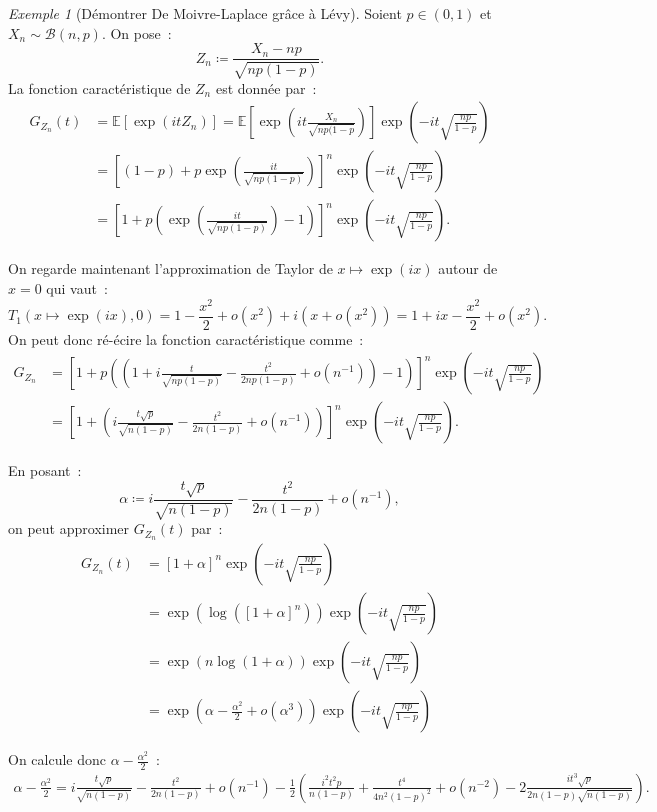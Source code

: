 \documentclass{article}
\newcommand{\E}{\mathbb E}
\theoremstyle{definition}
\theoremstyle{remark}
\newtheorem{ex}{Exemple}
\begin{document}
		\begin{ex}[Démontrer De Moivre-Laplace grâce à Lévy] Soient $p \in (0, 1)$ et $X_n \sim \mathcal B(n, p)$. On pose~:
		\[Z_n \coloneqq \frac {X_n - np}{\sqrt{np(1-p)}}.\]
		La fonction caractéristique de $Z_n$ est donnée par~:
		\begin{align*}
			G_{Z_n}(t) &= \E\left[\exp(itZ_n)\right] = \E\left[\exp\left(it\frac {X_n}{\sqrt{np(1-p}}\right)\right]\exp\left(-it \sqrt{\frac {np}{1-p}}\right) \\
			           &= \left[(1-p) + p\exp\left(\frac {it}{\sqrt{np(1-p)}}\right)\right]^n\exp\left(-it\sqrt {\frac {np}{1-p}}\right) \\
					   &= \left[1+p\left(\exp\left(\frac {it}{\sqrt{np(1-p)}}\right)-1\right)\right]^n\exp\left(-it\sqrt{\frac {np}{1-p}}\right).
		\end{align*}

		On regarde maintenant l'approximation de Taylor de $x \mapsto \exp(ix)$ autour de $x = 0$ qui vaut~:
		\[T_1(x \mapsto \exp(ix), 0) = 1 - \frac {x^2}2 + o(x^2) + i\left(x + o(x^2)\right) = 1 + ix - \frac {x^2}2 + o(x^2).\]
		On peut donc ré-écire la fonction caractéristique comme~:
		\begin{align*}
			G_{Z_n} &= \left[1+p\left(\left(1 + i\frac t{\sqrt{np(1-p)}} - \frac {t^2}{2np(1-p)} + o(n^{-1})\right) - 1\right)\right]^n\exp\left(-it\sqrt{\frac {np}{1-p}}\right) \\
			        &= \left[1+\left(i\frac {t\sqrt p}{\sqrt{n(1-p)}} - \frac {t^2}{2n(1-p)} + o(n^{-1})\right)\right]^n\exp\left(-it\sqrt {\frac {np}{1-p}}\right).
		\end{align*}

		En posant~:
		\[\alpha \coloneqq i\frac {t\sqrt p}{\sqrt{n(1-p)}} - \frac {t^2}{2n(1-p)} + o(n^{-1}),\]
		on peut approximer $G_{Z_n}(t)$ par~:
		\begin{align*}
			G_{Z_n}(t) &= \left[1 + \alpha\right]^n\exp\left(-it\sqrt{\frac{np}{1-p}}\right) \\
			           &= \exp\left(\log\left(\left[1 + \alpha\right]^n\right)\right)\exp\left(-it\sqrt{\frac {np}{1-p}}\right) \\
			           &= \exp\left(n\log(1+\alpha)\right)\exp\left(-it\sqrt{\frac{np}{1-p}}\right) \\
			           &= \exp\left(\alpha - \frac {\alpha^2}{2} + o(\alpha^3)\right)\exp\left(-it\sqrt{\frac{np}{1-p}}\right)
		\end{align*}

		On calcule donc $\alpha - \frac {\alpha^2}2$~:
		\begin{align*}
			\alpha - \frac {\alpha^2}2 = i\frac {t\sqrt p}{\sqrt {n(1-p)}} - \frac {t^2}{2n(1-p)} + o(n^{-1})
			                           - \frac 12\left(\frac {i^2t^2p}{n(1-p)} + \frac {t^4}{4n^2(1-p)^2} + o(n^{-2}) - 2\frac {it^3\sqrt p}{2n(1-p)\sqrt {n(1-p)}}\right).
		\end{align*}


\end{ex}
\end{document}
